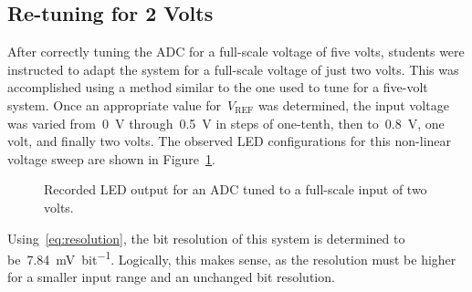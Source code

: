 \subsection{Re-tuning for 2 Volts}
After correctly tuning the ADC for a full-scale voltage of five volts, students were instructed to adapt the system for a full-scale voltage of just two volts.  This was accomplished using a method similar to the one used to tune for a five-volt system.  Once an appropriate value for~$V_\text{REF}$ was determined, the input voltage was varied from~\SI{0}{\volt} through~\SI{0.5}{\volt} in steps of one-tenth, then to~\SI{0.8}{\volt}, one volt, and finally two volts.  The observed LED configurations for this non-linear voltage sweep are shown in Figure~\ref{fig:pt6bars}.
%
\begin{figure}[H]
	\centering
	
	\parbox{.6\textwidth}{
	\caption[LED output for tuned ADC; $V_\text{FS} = \SI{2}{\volt}$]{Recorded LED output for an ADC tuned to a full-scale input of two volts.}
	\label{fig:pt6bars}}
\end{figure}
%
Using~\eqref{eq:resolution}, the bit resolution of this system is determined to be~\SI{7.84}{\milli\volt\per bit}.  Logically, this makes sense, as the resolution must be higher for a smaller input range and an unchanged bit resolution.
